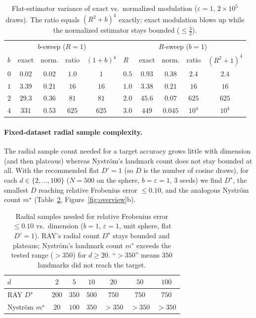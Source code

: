 \documentclass{article}
\begin{document}
\begin{table}[h]
\centering
\caption{Flat-estimator variance of exact vs.\ normalized modulation ($\varepsilon=1$, $2\times10^5$ draws). The ratio equals $(R^2+b)^4$ exactly; exact modulation blows up while the normalized estimator stays bounded ($\le\tfrac32$).}
\label{tab:normalized}
\begin{tabular}{lcccc@{\hskip 2em}lcccc}
\toprule
\multicolumn{5}{c}{$b$-sweep ($R{=}1$)} & \multicolumn{5}{c}{$R$-sweep ($b{=}1$)} \\
\cmidrule(lr){1-5}\cmidrule(lr){6-10}
$b$ & exact & norm. & ratio & $(1{+}b)^4$ & $R$ & exact & norm. & ratio & $(R^2{+}1)^4$ \\
\midrule
$0$ & $0.02$ & $0.02$ & $1.0$ & $1$    & $0.5$ & $0.93$ & $0.38$ & $2.4$  & $2.4$ \\
$1$ & $3.39$ & $0.21$ & $16$  & $16$   & $1.0$ & $3.38$ & $0.21$ & $16$   & $16$ \\
$2$ & $29.3$ & $0.36$ & $81$  & $81$   & $2.0$ & $45.6$ & $0.07$ & $625$  & $625$ \\
$4$ & $331$  & $0.53$ & $625$ & $625$  & $3.0$ & $449$  & $0.045$& $10^4$ & $10^4$ \\
\bottomrule
\end{tabular}
\end{table}

\paragraph{Fixed-dataset radial sample complexity.}
\label{sec:exp_dimfree}

The radial sample count needed for a target accuracy grows little with dimension (and then plateaus) whereas Nystr\"om's landmark count does not stay bounded at all. With the recommended flat $D'=1$ (so $D$ is the number of cosine draws), for each $d\in\{2,\dots,100\}$ ($N=500$ on the sphere, $b=\varepsilon=1$, $3$ seeds) we find $D^\star$, the smallest $D$ reaching relative Frobenius error $\le0.10$, and the analogous Nystr\"om count $m^\star$ (Table~\ref{tab:dimfree}, Figure~\ref{fig:overview}b).

\begin{table}[h]
\centering
\caption{Radial samples needed for relative Frobenius error $\le0.10$ vs.\ dimension ($b=1$, $\varepsilon=1$, unit sphere, flat $D'=1$). RAY's radial count $D^\star$ stays bounded and plateaus; Nystr\"om's landmark count $m^\star$ exceeds the tested range ($>350$) for $d\ge20$. ``$>350$'' means $350$ landmarks did not reach the target.}
\label{tab:dimfree}
\begin{tabular}{lcccccc}
\toprule
$d$ & $2$ & $5$ & $10$ & $20$ & $50$ & $100$ \\
\midrule
RAY $D^\star$        & $200$ & $350$ & $500$ & $750$ & $750$ & $750$ \\
Nystr\"om $m^\star$  & $20$ & $100$ & $350$ & $>350$ & $>350$ & $>350$ \\
\bottomrule
\end{tabular}
\end{table}
\end{document}
